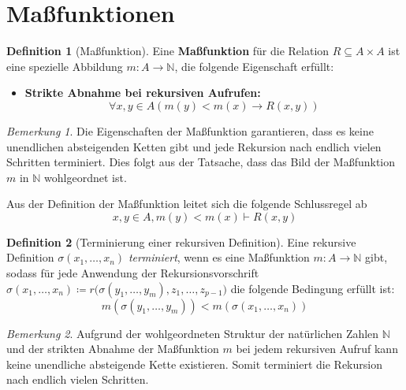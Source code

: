 \documentclass{book}
\theoremstyle{plain}
\theoremstyle{remark}
\newtheorem*{remark}{Bemerkung}
\theoremstyle{definition}
\newtheorem{definition}{Definition}[section]
\begin{document}
\section{Maßfunktionen}
\begin{definition}[Maßfunktion]
 Eine \textbf{Maßfunktion} für die Relation \(R\subseteq A\times A\) ist eine spezielle Abbildung \(m:A\rightarrow\mathbb{N}\), die folgende Eigenschaft erfüllt: 
    \begin{itemize}
        \item \textbf{Strikte Abnahme bei rekursiven Aufrufen:} \newline
        \[\forall x,y\in A(m(y)<m(x)\rightarrow R(x,y))\]
    \end{itemize}
\end{definition}
\begin{remark}
Die Eigenschaften der Maßfunktion garantieren, dass es keine unendlichen absteigenden Ketten gibt und jede Rekursion nach endlich vielen Schritten terminiert. Dies folgt aus der Tatsache, dass das Bild der Maßfunktion \(m\) in \(\mathbb{N}\) wohlgeordnet ist.
\end{remark}
Aus der Definition der Maßfunktion leitet sich die folgende Schlussregel ab 
\[x,y\in A,m(y)<m(x)\vdash R(x,y)\]

\begin{definition}[Terminierung einer rekursiven Definition]
    Eine rekursive Definition \(\sigma(x_1, \ldots, x_n)\) \emph{terminiert}, wenn es eine Maßfunktion \(m: A \rightarrow \mathbb{N}\) gibt, sodass für jede Anwendung der Rekursionsvorschrift \(\sigma(x_1, \ldots, x_n) \coloneqq r\big(\sigma(y_1, \ldots, y_m), z_1, \ldots, z_{p-1}\big)\) die folgende Bedingung erfüllt ist:
    \[
        m(\sigma(y_1, \ldots, y_m)) < m(\sigma(x_1, \ldots, x_n))
    \]
\end{definition}
\begin{remark}
    Aufgrund der wohlgeordneten Struktur der natürlichen Zahlen \(\mathbb{N}\) und der strikten Abnahme der Maßfunktion \(m\) bei jedem rekursiven Aufruf kann keine unendliche absteigende Kette existieren. Somit terminiert die Rekursion nach endlich vielen Schritten.
\end{remark}
\end{document}
